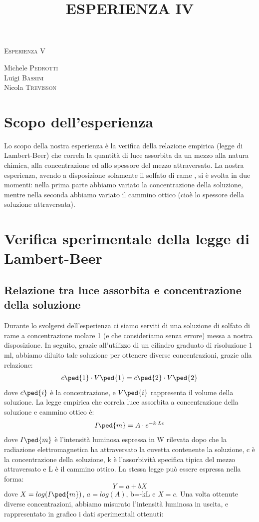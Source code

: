 \documentclass[a4paper,11pt]{article}
\begin{document}
\begin{center}



\textsc{\Huge Esperienza V}\\[0.5cm]



\large
\title{ESPERIENZA IV}

Michele \textsc{Pedrotti}\\
Luigi \textsc{Bassini}\\
Nicola \textsc{Trevisson}\\


\end{center}
\vspace{0.1 cm}
\section{Scopo dell'esperienza}
 Lo scopo della nostra esperienza è la verifica della relazione empirica (legge di Lambert-Beer) che correla la quantità di luce assorbita da un mezzo alla natura chimica, alla concentrazione ed allo spessore del mezzo attraversato. La nostra esperienza, avendo a disposizione solamente il solfato di rame , si è svolta in due momenti: nella prima parte abbiamo variato la concentrazione della soluzione, mentre nella seconda abbiamo variato il cammino ottico (cioè lo spessore della soluzione attraversata).

\section{Verifica sperimentale della legge di Lambert-Beer}
\subsection{Relazione tra luce assorbita e concentrazione della soluzione}
Durante lo svolgersi dell'esperienza ci siamo serviti di una soluzione di solfato di rame a concentrazione molare 1 (e che consideriamo senza errore) messa a nostra disposizione. In seguito, grazie all'utilizzo di un cilindro graduato di risoluzione 1 ml, abbiamo diluito tale soluzione per ottenere diverse concentrazioni, grazie alla relazione: $$c\ped{1}\cdot V\ped{1}=c\ped{2}\cdot V\ped{2}$$ dove $c\ped{i}$ è la concentrazione, e $V\ped{i}$ rappresenta il volume della soluzione. La legge empirica che correla luce assorbita a concentrazione della soluzione e cammino ottico è: $$I\ped{m}=A\cdot e^{-k\cdot Lc}$$
dove $I\ped{m}$ è l'intensità luminosa espressa in W rilevata dopo che la radiazione elettromagnetica ha attraversato la cuvetta contenente la soluzione, c è la concentrazione della soluzione, k è l'assorbività specifica tipica del mezzo attraversato e L è il cammino ottico. La stessa legge può essere espressa nella forma: $$Y=a+bX$$ dove $X=log(I\ped{m})$, $a=log(A)$, b=-kL e $X=c$.
Una volta ottenute diverse concentrazioni, abbiamo misurato l'intensità luminosa in uscita, e rappresentato in grafico i dati sperimentali ottenuti:   
\end{document}
